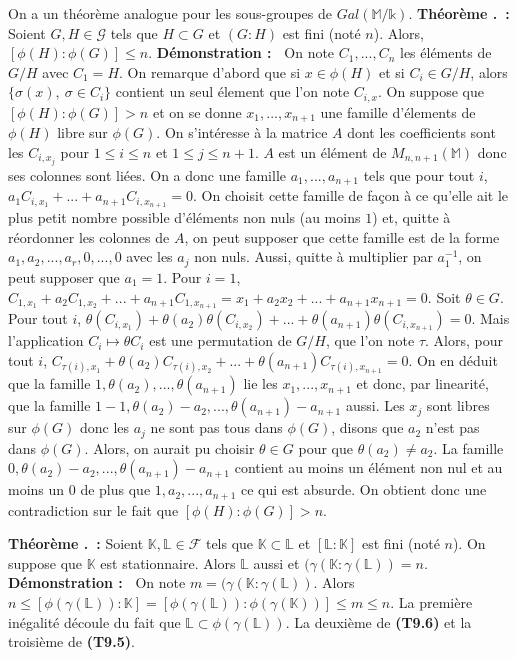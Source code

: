 \documentclass[5pt,a4paper]{article}
\newcounter{thm}[section]
\renewcommand{\thethm}{\thesection.\arabic{thm}}
\newcommand{\thm}[1]{\stepcounter{thm}\noindent\textbf{Théorème \thethm ~:} #1 \newline}
\newcommand{\demo}[1]{\textbf{Démonstration :~} #1 \newline}
\begin{document}
\begin{onehalfspacing}
On a un théorème analogue pour les sous-groupes de $Gal(\mathbb{M}/\mathds{k})$. \newline
\thm{Soient $G, H \in \mathcal{G}$ tels que $H \subset G$ et $(G : H)$ est fini (noté $n$). Alors, $[\phi(H) : \phi(G)] \leq n$.}
\demo{On note $C_1, ..., C_n$ les éléments de $G/H$ avec $C_1 = H$. On remarque d'abord que si $x \in \phi(H)$ et si $C_i \in G/H$, alors $\{\sigma(x),~ \sigma \in C_i\}$ contient un seul élement que l'on note $C_{i, x}$. On suppose que $[\phi(H) : \phi(G)] > n$ et on se donne $x_1, ..., x_{n+1}$ une famille d'élements de $\phi(H)$ libre sur $\phi(G)$. On s'intéresse à la matrice $A$ dont les coefficients sont les $C_{i, x_j}$ pour $1 \leq i \leq n$ et $1 \leq j \leq n+1$. $A$ est un élément de $M_{n, n+1}(\mathbb{M})$ donc ses colonnes sont liées. On a donc une famille $a_1, ..., a_{n+1}$ tels que pour tout $i$, $a_1C_{i, x_1} + ... + a_{n+1}C_{i, x_{n+1}} = 0$. On choisit cette famille de façon à ce qu'elle ait le plus petit nombre possible d'éléments non nuls (au moins $1$) et, quitte à réordonner les colonnes de $A$, on peut supposer que cette famille est de la forme $a_1, a_2, ..., a_r, 0, ..., 0$ avec les $a_j$ non nuls. Aussi, quitte à multiplier par $a_1^{-1}$, on peut supposer que $a_1 = 1$. Pour $i = 1$, $C_{1, x_1} + a_2C_{1, x_2} + ... + a_{n+1}C_{1, x_{n+1}} = x_1 + a_2x_2 + ... + a_{n+1}x_{n+1} = 0$. Soit $\theta \in G$. Pour tout $i$, $\theta(C_{i, x_1}) + \theta(a_2)\theta(C_{i, x_2}) + ... + \theta(a_{n+1})\theta(C_{i, x_{n+1}}) = 0$. Mais l'application $C_i \mapsto \theta C_i$ est une permutation de $G/H$, que l'on note $\tau$. Alors, pour tout $i$, $C_{\tau(i), x_1} + \theta(a_2)C_{\tau(i), x_2} + ... + \theta(a_{n+1})C_{\tau(i), x_{n+1}} = 0$. On en déduit que la famille $1, \theta(a_2), ..., \theta(a_{n+1})$ lie les $x_1, ..., x_{n+1}$ et donc, par linearité, que la famille $1 - 1, \theta(a_2) - a_2, ..., \theta(a_{n+1}) - a_{n+1}$ aussi. Les $x_j$ sont libres sur $\phi(G)$ donc les $a_j$ ne sont pas tous dans $\phi(G)$, disons que $a_2$ n'est pas dans $\phi(G)$. Alors, on aurait pu choisir $\theta \in G$ pour que $\theta(a_2) \neq a_2$. La famille $0, \theta(a_2) - a_2, ..., \theta(a_{n+1}) - a_{n+1}$ contient au moins un élément non nul et au moins un $0$ de plus que $1, a_2, ..., a_{n+1}$ ce qui est absurde. On obtient donc une contradiction sur le fait que $[\phi(H) : \phi(G)] > n$.}


\thm{Soient $\mathbb{K}, \mathbb{L} \in \mathcal{F}$ tels que $\mathbb{K} \subset \mathbb{L}$ et $[\mathbb{L} : \mathbb{K}]$ est fini (noté $n$). On suppose que $\mathbb{K}$ est stationnaire. Alors $\mathbb{L}$ aussi et $(\gamma(\mathbb{K} : \gamma(\mathbb{L})) = n$.}
\demo{On note $m = (\gamma(\mathbb{K} : \gamma(\mathbb{L}))$. Alors $n \leq [\phi(\gamma(\mathbb{L})) : \mathbb{K}] = [\phi(\gamma(\mathbb{L})) : \phi(\gamma(\mathbb{K}))] \leq m \leq n$. La première inégalité découle du fait que $\mathbb{L} \subset \phi(\gamma(\mathbb{L}))$. La deuxième de \textbf{(T9.6)} et la troisième de \textbf{(T9.5)}.}



\end{onehalfspacing}
\end{document}
